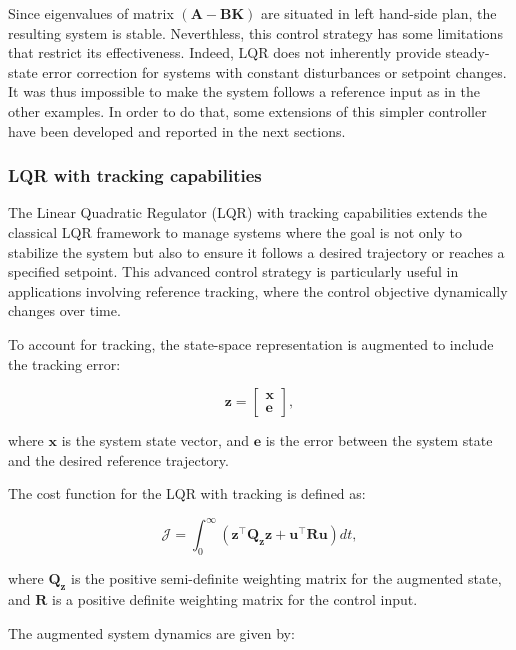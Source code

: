 Since eigenvalues of matrix $\mathbf{(A-BK)}$ are situated in left hand-side plan, the resulting system is stable. Neverthless, this control strategy has some limitations that restrict its effectiveness. Indeed, LQR does not inherently provide steady-state error correction for systems with constant disturbances or setpoint changes. It was thus impossible to make the system follows a reference input as in the other examples. In order to do that, some extensions of this simpler controller have been developed and reported in the next sections.

\subsubsection{LQR with tracking capabilities}
\label{subsubsec:lqr_tracking}

The Linear Quadratic Regulator (LQR) with tracking capabilities extends the classical LQR framework to manage systems where the goal is not only to stabilize the system but also to ensure it follows a desired trajectory or reaches a specified setpoint. This advanced control strategy is particularly useful in applications involving reference tracking, where the control objective dynamically changes over time.

To account for tracking, the state-space representation is augmented to include the tracking error:

\begin{equation}
    \mathbf{z} = \begin{bmatrix} \mathbf{x} \\ \mathbf{e} \end{bmatrix},
\end{equation}

where $\mathbf{x}$ is the system state vector, and $\mathbf{e}$ is the error between the system state and the desired reference trajectory.

The cost function for the LQR with tracking is defined as:

\begin{equation}
    \mathcal{J} = \int_0^\infty (\mathbf{z}^\top \mathbf{Q_z} \mathbf{z} + \mathbf{u}^\top \mathbf{R} \mathbf{u} ) dt,
\end{equation}

where $\mathbf{Q_z}$ is the positive semi-definite weighting matrix for the augmented state, and $\mathbf{R}$ is a positive definite weighting matrix for the control input.

The augmented system dynamics are given by:

